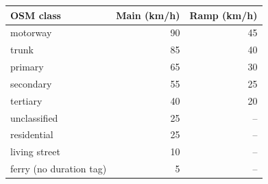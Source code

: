 \begin{tabular}{@{}lrr@{}}
\toprule
OSM class & Main (km/h) & Ramp (km/h) \\
\midrule
motorway & 90 & 45 \\
trunk & 85 & 40 \\
primary & 65 & 30 \\
secondary & 55 & 25 \\
tertiary & 40 & 20 \\
unclassified & 25 & -- \\
residential & 25 & -- \\
living street & 10 & -- \\
ferry (no duration tag) & 5 & -- \\
\bottomrule
\end{tabular}
